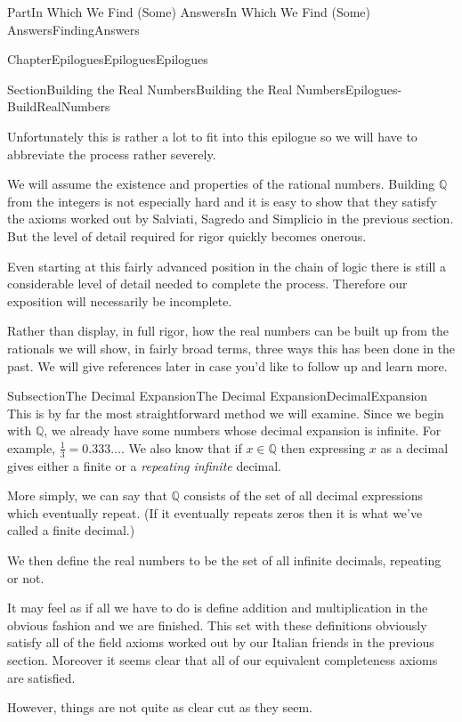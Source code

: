 \documentclass[oneside,10pt,]{book}
\numberwithin{equation}{part}
\newcommand{\QQ}{\mathbb {Q}}
\begin{document}
\begin{partptx}{Part}{In Which We Find (Some) Answers}{}{In Which We Find (Some) Answers}{}{}{FindingAnswers}
\begin{chapterptx}{Chapter}{Epilogues}{}{Epilogues}{}{}{Epilogues}
\begin{sectionptx}{Section}{Building the Real Numbers}{}{Building the Real Numbers}{}{}{Epilogues-BuildRealNumbers}
\begin{introduction}{}
\par
Unfortunately this is rather a lot to fit into this epilogue so we will have to abbreviate the process rather severely.%
\par
We will assume the existence and properties of the rational numbers.  Building \(\QQ\) from the integers is not especially hard and it is easy to show that they satisfy the axioms worked out by Salviati, Sagredo and Simplicio in the previous section.  But the level of detail required for rigor quickly becomes onerous.%
\par
Even starting at this fairly advanced position in the chain of logic there is still a considerable level of detail needed to complete the process.  Therefore our exposition will necessarily be incomplete.%
\par
Rather than display, in full rigor, how the real numbers can be built up from the rationals we will show, in fairly broad terms, three ways this has been done in the past.  We will give references later in case you'd like to follow up and learn more.%
\end{introduction}%
%
%
\typeout{************************************************}
\typeout{************************************************}
%
\begin{subsectionptx}{Subsection}{The Decimal Expansion}{}{The Decimal Expansion}{}{}{DecimalExpansion}
This is by far the most straightforward method we will examine.  Since we begin with \(\QQ\), we already have some numbers whose decimal expansion is infinite.  For example, \(\frac13= 0.333\ldots\).  We also know that if \(x\in\QQ\) then expressing \(x\) as a decimal gives either a finite or a \emph{repeating infinite} decimal.%
\par
More simply, we can say that \(\QQ\) consists of the set of all decimal expressions which eventually repeat.  (If it eventually repeats zeros then it is what we've called a finite decimal.)%
\par
We then define the real numbers to be the set of all infinite decimals, repeating or not.%
\par
It may feel as if all we have to do is define addition and multiplication in the obvious fashion and we are finished. This set with these definitions obviously satisfy all of the field axioms worked out by our Italian friends in the previous section.  Moreover it seems clear that all of our equivalent completeness axioms are satisfied.%
\par
However, things are not quite as clear cut as they seem.%

\end{subsectionptx}
\end{sectionptx}
\end{chapterptx}
\end{partptx}
\end{document}
